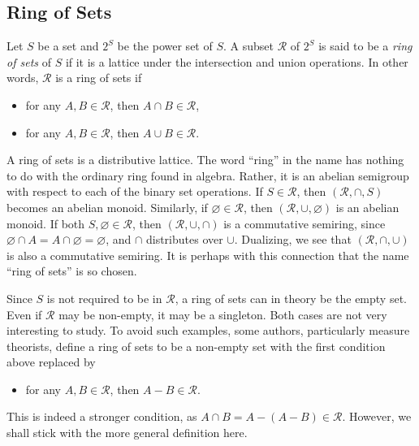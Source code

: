 \documentclass[12pt]{article}
\begin{document}
\subsection*{Ring of Sets}
Let $S$ be a set and $2^S$ be the power set of $S$.  A subset $\mathcal{R}$ of $2^S$ is said to be a \emph{ring of sets} of $S$ if it is a lattice under the intersection and union operations.  In other words, $\mathcal{R}$ is a ring of sets if 
\begin{itemize}
\item for any $A,B\in \mathcal{R}$, then $A\cap B\in \mathcal{R}$,
\item for any $A,B\in \mathcal{R}$, then $A\cup B\in \mathcal{R}$.
\end{itemize}

A ring of sets is a distributive lattice.  The word ``ring'' in the name has nothing to do with the ordinary ring found in algebra.  Rather, it is an abelian semigroup with respect to each of the binary set operations.  If $S\in\mathcal{R}$, then $(\mathcal{R},\cap,S)$ becomes an abelian monoid.  Similarly, if $\varnothing\in\mathcal{R}$, then $(\mathcal{R},\cup,\varnothing)$ is an abelian monoid.  If both $S,\varnothing\in\mathcal{R}$, then $(\mathcal{R},\cup,\cap)$ is a commutative semiring, since $\varnothing\cap A=A\cap\varnothing=\varnothing$, and $\cap$ distributes over $\cup$.  Dualizing, we see that $(\mathcal{R},\cap,\cup)$ is also a commutative semiring.  It is perhaps with this connection that the name ``ring of sets'' is so chosen.

Since $S$ is not required to be in $\mathcal{R}$, a ring of sets can in theory be the empty set.  Even if $\mathcal{R}$ may be non-empty, it may be a singleton.  Both cases are not very interesting to study.  To avoid such examples, some authors, particularly measure theorists, define a ring of sets to be a non-empty set with the first condition above replaced by
\begin{itemize}
\item for any $A,B\in \mathcal{R}$, then $A-B\in \mathcal{R}$.
\end{itemize}
This is indeed a stronger condition, as $A\cap B=A-(A-B)\in \mathcal{R}$.  However, we shall stick with the more general definition here.
\end{document}
